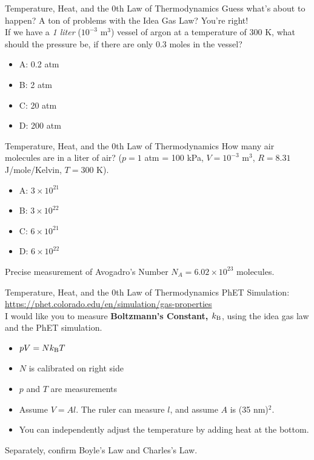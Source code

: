 \documentclass{beamer}
\begin{document}
\begin{frame}{Temperature, Heat, and the 0th Law of Thermodynamics}
Guess what's about to happen?  A ton of problems with the Idea Gas Law?  You're right! \\ \vspace{0.5cm}
If we have a \textit{1 liter} ($10^{-3}$ m$^3$) vessel of argon at a temperature of 300 K, what should the pressure be, if there are only 0.3 moles in the vessel?
\begin{itemize}
\item A: 0.2 atm
\item B: 2 atm
\item C: 20 atm
\item D: 200 atm
\end{itemize}
\end{frame}

\begin{frame}{Temperature, Heat, and the 0th Law of Thermodynamics}
How many air molecules are in a liter of air? ($p = 1$ atm = 100 kPa, $V = 10^{-3}$ m$^3$, $R = 8.31$ J/mole/Kelvin, $T = 300$ K).
\begin{itemize}
\item A: $3 \times 10^{21}$
\item B: $3 \times 10^{22}$
\item C: $6 \times 10^{21}$
\item D: $6 \times 10^{22}$
\end{itemize}
Precise measurement of Avogadro's Number $N_A = 6.02 \times 10^{23}$ molecules.
\end{frame}

\begin{frame}{Temperature, Heat, and the 0th Law of Thermodynamics}
PhET Simulation:
\url{https://phet.colorado.edu/en/simulation/gas-properties} \\ \vspace{0.5cm}
I would like you to measure \textbf{\alert{Boltzmann's Constant, $k_{\rm B}$}}, using the idea gas law and the PhET simulation.
\begin{itemize}
\item $pV = Nk_{\rm B}T$
\item $N$ is calibrated on right side
\item $p$ and $T$ are measurements
\item Assume $V = Al$.  The ruler can measure $l$, and assume $A$ is (35 nm)$^2$.
\item You can independently adjust the temperature by adding heat at the bottom.
\end{itemize}
Separately, confirm Boyle's Law and Charles's Law.
\end{frame}
\end{document}
